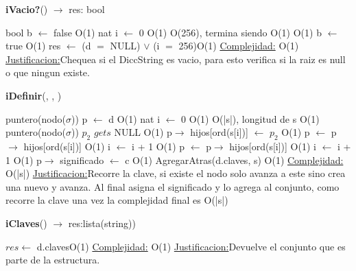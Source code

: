 \begin{Algoritmos}
\begin{algorithm}[H]{\textbf{iVacio?}() $\to$ res: bool}
	\begin{algorithmic}[1]
		\State bool b $\gets$ false \Comment O(1)
		\State nat i $\gets$ 0 \Comment O(1)
		 \Comment O(256), termina siendo O(1)
			 \Comment O(1)
				 \State b $\gets$ true \Comment O(1)
			\EndIf
		\EndWhile
		\State res $\gets$ (d $=$ NULL) $\vee$ (i $=$ 256)\Comment O(1)
		\medskip
		\Statex \underline{Complejidad:} O(1)
			\Statex \underline{Justificacion:}Chequea si el DiccString es vacio, para esto verifica si la raiz es null o que ningun existe.
	\end{algorithmic}
\end{algorithm}

\begin{algorithm}[H]{\textbf{iDefinir}(, , )}
	\begin{algorithmic}[1]
		\State puntero(nodo($\sigma$)) p $\gets$ d \Comment O(1)
		\State nat i $\gets$ 0 \Comment O(1)
		 \Comment O(|s|), longitud de s
			 \Comment O(1) 
				\State puntero(nodo($\sigma$)) $p_2$ $gets$ NULL \Comment O(1)
				\State p$\to$ hijos[ord(s[i])] $\gets$ $p_2$ \Comment O(1)	
				\State p $\gets$ p$\to$ hijos[ord(s[i])] \Comment O(1)
				\State i $\gets$ i + 1 \Comment O(1)
			\Else
				\State p $\gets$ p$\to$ hijos[ord(s[i])] \Comment O(1)
				\State i $\gets$ i + 1 \Comment O(1)
			\EndIf
		\EndWhile
		\State p$\to$ significado $\gets$ c \Comment O(1)		
		\State AgregarAtras(d.claves, s) \Comment O(1)
		\medskip
		\Statex \underline{Complejidad:} O(|s|)
			\Statex \underline{Justificacion:}Recorre la clave, si existe el nodo solo avanza a este sino crea una nuevo y avanza. Al final asigna el significado y lo agrega al conjunto, como recorre la clave una vez la complejidad final es O(|s|)
	\end{algorithmic}
\end{algorithm}

\begin{algorithm}[H]{\textbf{iClaves}() $\to$ res:lista(string))}
	\begin{algorithmic}[1]
		\State $res \gets$ d.claves\Comment O(1)
		\medskip
		\Statex \underline{Complejidad:} O(1)
			\Statex \underline{Justificacion:}Devuelve el conjunto que es parte de la estructura.
	\end{algorithmic}
\end{algorithm}


\end{Algoritmos}
